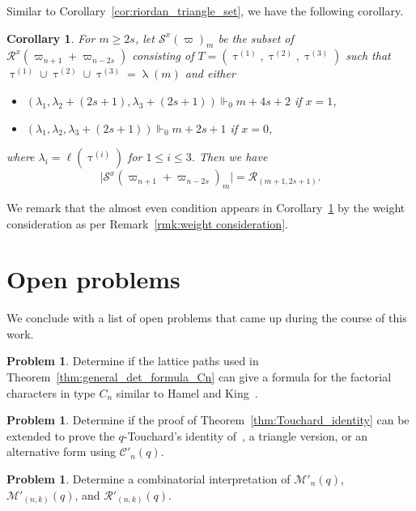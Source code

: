 \documentclass[11pt, leqno]{amsart}
\theoremstyle{plain}
\newtheorem{corollary}[theorem]{Corollary}
\theoremstyle{definition}
\newtheorem{problem}[theorem]{Problem}
\numberwithin{equation}{section}
\newcommand{\fw}{\varpi} %
\newcommand{\ntau}[1]{\btau^{(#1)}}
\newcommand{\btau}{\uptau}
\newcommand{\Cat}{\mathcal{C}} %
\newcommand{\Mot}{\mathcal{M}} %
\newcommand{\Rior}{\mathcal{R}} %
\begin{document}
Similar to Corollary~\ref{cor:riordan_triangle_set}, we have the following corollary.

\begin{corollary} \label{cor: main Rd odd}  For $m \ge 2s$,
let $\mathscr{S}^x(\fw)_m$ be the subset of $\mathscr{R}^x(\fw_{n+1}+\fw_{n-2s})$ consisting of $T=(\ntau{1},\ntau{2},\ntau{3})$ such that $\ntau{1} \cup \ntau{2} \cup \ntau{3}=\uplambda(m)$ and either
\begin{itemize}
\item $(\lambda_1,\lambda_2+(2s+1),\lambda_3+(2s+1)) \Vdash_0 m+4s+2$ if $x = 1$,
\item $(\lambda_1,\lambda_2,\lambda_3+(2s+1)) \Vdash_0 m+2s+1$ if $x = 0$,
\end{itemize}
where $\lambda_i = \ell(\ntau{i})$ for $1 \le i \le 3$.
Then we have
\[
\lvert \mathscr{S}^x(\fw_{n+1}+\fw_{n-2s})_m \rvert = \Rior_{(m+1,2s+1)}.
\]
\end{corollary}

We remark that the almost even condition appears in Corollary~\ref{cor: main Rd odd} by the weight consideration as per Remark~\ref{rmk:weight consideration}.










\section{Open problems}
\label{sec:problems}

We conclude with a list of open problems that came up during the course of this work.

\begin{problem}
Determine if the lattice paths used in Theorem~\ref{thm:general_det_formula_Cn} can give a formula for the factorial characters in type $C_n$ similar to Hamel and King~\cite{HK17}.
\end{problem}

\begin{problem}
Determine if the proof of Theorem~\ref{thm:Touchard_identity} can be extended to prove the $q$-Touchard's identity of~\cite[Thm.~1]{Andrews10}, a triangle version, or an alternative form using $\Cat'_n(q)$.
\end{problem}

\begin{problem}
Determine a combinatorial interpretation of $\Mot'_n(q)$, $\Mot'_{(n,k)}(q)$, and $\Rior'_{(n,k)}(q)$.
\end{problem}
\end{document}
